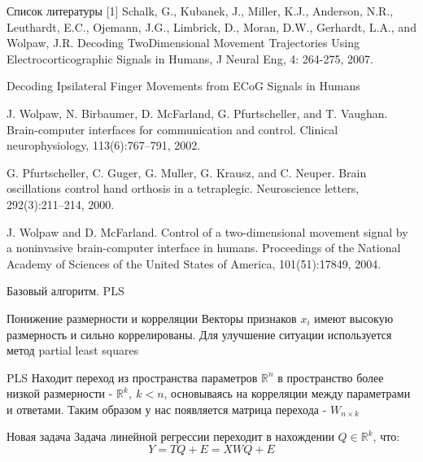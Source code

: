 \documentclass{beamer}
\begin{document}
\begin{frame}{Список литературы}
[1] Schalk, G., Kubanek, J., Miller, K.J., Anderson, N.R., Leuthardt, E.C., Ojemann, J.G., Limbrick, D., Moran, D.W., Gerhardt, L.A., and Wolpaw, J.R. Decoding TwoDimensional Movement Trajectories Using Electrocorticographic Signals in Humans, J Neural Eng, 4: 264-275, 2007. \par
[2] Decoding Ipsilateral Finger Movements from ECoG Signals in Humans \par
[3] J. Wolpaw, N. Birbaumer, D. McFarland, G. Pfurtscheller, and T. Vaughan. Brain-computer interfaces for communication and control. Clinical neurophysiology, 113(6):767–791, 2002. \par 
[4] G. Pfurtscheller, C. Guger, G. Muller, G. Krausz, and C. Neuper. Brain oscillations control hand orthosis in a tetraplegic. Neuroscience letters, 292(3):211–214, 2000. \par
[5] J. Wolpaw and D. McFarland. Control of a two-dimensional movement signal by a noninvasive brain-computer interface in humans. Proceedings of the National Academy of Sciences of the United States of America, 101(51):17849, 2004.
\end{frame}
\begin{frame}{Базовый алгоритм. PLS}
\begin{block}{Понижение размерности и корреляции}
Векторы признаков $x_i$ имеют высокую размерность и сильно коррелированы. Для улучшение ситуации используется метод partial least squares
\end{block}
\begin{block}{PLS}
Находит переход из пространства параметров $\mathbb{R}^n$ в пространство более низкой размерности - $\mathbb{R}^k,\ k < n$, основываясь на корреляции между параметрами и ответами. Таким образом у нас появляется матрица перехода - $W_{n \times k}$
\end{block}
\begin{block}{Новая задача}
Задача линейной регрессии переходит в нахождении $Q \in \mathbb{R}^k$, что:
$$Y = T Q + E = X W Q + E$$
\end{block}

\end{frame}
\end{document}
